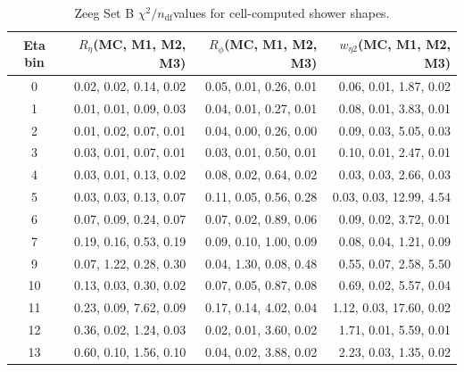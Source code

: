 \documentclass[11pt,a4paper]{article}
\newcommand{\Reta}{\ensuremath{R_{\eta}}}
\newcommand{\Rphi}{\ensuremath{R_{\phi}}}
\newcommand{\weta}{\ensuremath{w_{\eta 2}}}
\newcommand{\chisq}{\ensuremath{\chi^2 / n_{\mathrm{df}}}}
\begin{document}
\begin{table}[H]
\centering
\caption{Zeeg Set B \chisq values for cell-computed shower shapes.}
\label{tab:setB-zeeg}
\begin{tabular}{crrr}
\toprule
Eta bin & \Reta (MC, M1, M2, M3) & \Rphi (MC, M1, M2, M3) & \weta (MC, M1, M2, M3) \\
\midrule
0  & 0.02, 0.02, 0.14, 0.02 & 0.05, 0.01, 0.26, 0.01 & 0.06, 0.01, 1.87, 0.02 \\
1  & 0.01, 0.01, 0.09, 0.03 & 0.04, 0.01, 0.27, 0.01 & 0.08, 0.01, 3.83, 0.01 \\
2  & 0.01, 0.02, 0.07, 0.01 & 0.04, 0.00, 0.26, 0.00 & 0.09, 0.03, 5.05, 0.03 \\
3  & 0.03, 0.01, 0.07, 0.01 & 0.03, 0.01, 0.50, 0.01 & 0.10, 0.01, 2.47, 0.01 \\
4  & 0.03, 0.01, 0.13, 0.02 & 0.08, 0.02, 0.64, 0.02 & 0.03, 0.03, 2.66, 0.03 \\
5  & 0.03, 0.03, 0.13, 0.07 & 0.11, 0.05, 0.56, 0.28 & 0.03, 0.03, 12.99, 4.54 \\
6  & 0.07, 0.09, 0.24, 0.07 & 0.07, 0.02, 0.89, 0.06 & 0.09, 0.02, 3.72, 0.01 \\
7  & 0.19, 0.16, 0.53, 0.19 & 0.09, 0.10, 1.00, 0.09 & 0.08, 0.04, 1.21, 0.09 \\
9  & 0.07, 1.22, 0.28, 0.30 & 0.04, 1.30, 0.08, 0.48 & 0.55, 0.07, 2.58, 5.50 \\
10 & 0.13, 0.03, 0.30, 0.02 & 0.07, 0.05, 0.87, 0.08 & 0.69, 0.02, 5.57, 0.04 \\
11 & 0.23, 0.09, 7.62, 0.09 & 0.17, 0.14, 4.02, 0.04 & 1.12, 0.03, 17.60, 0.02 \\
12 & 0.36, 0.02, 1.24, 0.03 & 0.02, 0.01, 3.60, 0.02 & 1.71, 0.01, 5.59, 0.01 \\
13 & 0.60, 0.10, 1.56, 0.10 & 0.04, 0.02, 3.88, 0.02 & 2.23, 0.03, 1.35, 0.02 \\
\bottomrule
\end{tabular}
\end{table}
\end{document}
